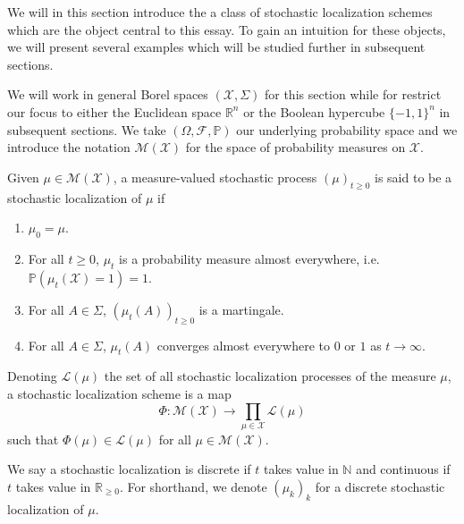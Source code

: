 We will in this section introduce the a class of stochastic localization schemes which are the object 
central to this essay. To gain an intuition for these objects, we will present several examples which 
will be studied further in subsequent sections. 

We will work in general Borel spaces \((\mathcal{X}, \Sigma)\) for this section while for restrict our 
focus to either the Euclidean space \(\mathbb{R}^n\) or the Boolean hypercube \(\{-1, 1\}^n\) 
in subsequent sections. We take \((\Omega, \mathscr{F}, \mathbb{P})\) our underlying probability space 
and we introduce the notation \(\mathcal{M}(\mathcal{X})\) for the space of probability measures on 
\(\mathcal{X}\).

\begin{definition}
  Given \(\mu \in \mathcal{M}(\mathcal{X})\), a measure-valued stochastic process 
  \((\mu)_{t \ge 0}\) is said to be a stochastic localization of \(\mu\) if 
  \begin{enumerate}[label=(L\arabic*), start=0]
    \item \label{L0} \(\mu_0 = \mu\).
    \item \label{L1} For all \(t \ge 0\), \(\mu_t\) is a probability measure almost everywhere, i.e. 
      \(\mathbb{P}(\mu_t(\mathcal{X}) = 1) = 1\).
    \item \label{L2} For all \(A \in \Sigma\), \((\mu_t(A))_{t \ge 0}\) is a martingale.
    \item \label{L3} For all \(A \in \Sigma\), \(\mu_t(A)\) converges almost everywhere to \(0\) 
      or \(1\) as \(t \to \infty\).
  \end{enumerate}
\end{definition}

\begin{definition}
  Denoting \(\mathcal{L}(\mu)\) the set of all stochastic localization processes of the measure
  \(\mu\), a stochastic localization scheme is a map 
  \[\Phi : \mathcal{M}(\mathcal{X}) \to \prod_{\mu \in \mathcal{X}} \mathcal{L}(\mu)\] 
  such that \(\Phi(\mu) \in \mathcal{L}(\mu)\) for all \(\mu \in \mathcal{M}(\mathcal{X})\).
\end{definition}

We say a stochastic localization is discrete if \(t\) takes value in \(\mathbb{N}\) and continuous 
if \(t\) takes value in \(\mathbb{R}_{\ge 0}\). For shorthand, we denote \((\mu_k)_k\) for a
discrete stochastic localization of \(\mu\).

